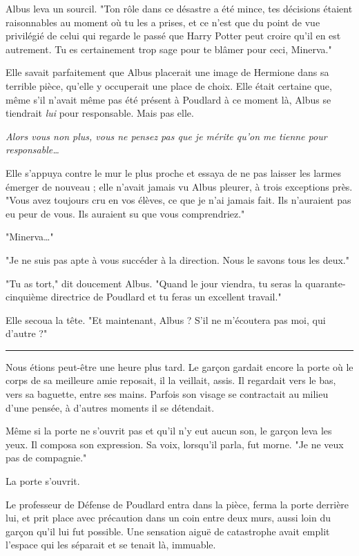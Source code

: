 Albus leva un sourcil. "Ton rôle dans ce désastre a été mince, tes décisions étaient raisonnables au moment où tu les a prises, et ce n'est que du point de vue privilégié de celui qui regarde le passé que Harry Potter peut croire qu'il en est autrement. Tu es certainement trop sage pour te blâmer pour ceci, Minerva."

Elle savait parfaitement que Albus placerait une image de Hermione dans sa terrible pièce, qu'elle y occuperait une place de choix. Elle était certaine que, même s'il n'avait même pas été présent à Poudlard à ce moment là, Albus se tiendrait \emph{lui}  pour responsable. Mais pas elle.

\emph{Alors vous non plus, vous ne pensez pas que je mérite qu'on me tienne pour responsable…} 

Elle s'appuya contre le mur le plus proche et essaya de ne pas laisser les larmes émerger de nouveau ; elle n'avait jamais vu Albus pleurer, à trois exceptions près. "Vous avez toujours cru en vos élèves, ce que je n'ai jamais fait. Ils n'auraient pas eu peur de vous. Ils auraient su que vous comprendriez."

"Minerva…"

"Je ne suis pas apte à vous succéder à la direction. Nous le savons tous les deux."

"Tu as tort," dit doucement Albus. "Quand le jour viendra, tu seras la quarante-cinquième directrice de Poudlard et tu feras un excellent travail."

Elle secoua la tête. "Et maintenant, Albus ? S'il ne m'écoutera pas moi, qui d'autre ?"
\par\noindent\rule{\textwidth}{0.4pt}
Nous étions peut-être une heure plus tard. Le garçon gardait encore la porte où le corps de sa meilleure amie reposait, il la veillait, assis. Il regardait vers le bas, vers sa baguette, entre ses mains. Parfois son visage se contractait au milieu d'une pensée, à d'autres moments il se détendait.

Même si la porte ne s'ouvrit pas et qu'il n'y eut aucun son, le garçon leva les yeux. Il composa son expression. Sa voix, lorsqu'il parla, fut morne. "Je ne veux pas de compagnie."

La porte s'ouvrit.

Le professeur de Défense de Poudlard entra dans la pièce, ferma la porte derrière lui, et prit place avec précaution dans un coin entre deux murs, aussi loin du garçon qu'il lui fut possible. Une sensation aiguë de catastrophe avait emplit l'espace qui les séparait et se tenait là, immuable.

